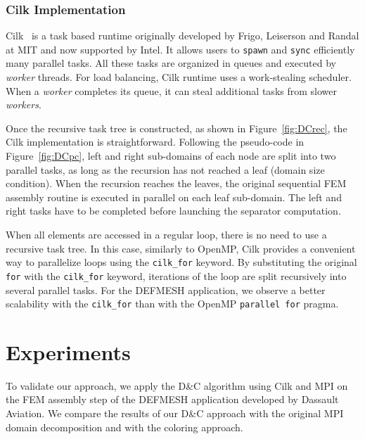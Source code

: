 \documentclass[10pt]{IOS-Book-Article}
\begin{document}
\subsubsection{Cilk Implementation}
Cilk~\cite{cilk5} is a task based runtime originally developed by Frigo, Leiserson and Randal at MIT and now supported by Intel.
It allows users to {\tt spawn} and {\tt sync} efficiently many parallel tasks.
All these tasks are organized in queues and executed by \emph{worker} threads.
For load balancing, Cilk runtime uses a work-stealing scheduler.
When a \emph{worker} completes its queue, it can steal additional tasks from slower \emph{workers}.

Once the recursive task tree is constructed, as shown in Figure~\ref{fig:DCrec}, the Cilk implementation is straightforward.
Following the pseudo-code in Figure~\ref{fig:DCpc}, left and right sub-domains of each node are split into two parallel tasks, as long as the recursion has not reached a leaf (domain size condition).
When the recursion reaches the leaves, the original sequential FEM assembly routine is executed in parallel on each leaf sub-domain.
The left and right tasks have to be completed before launching the separator computation. 


When all elements are accessed in a regular loop, there is no need to use a recursive task tree.
In this case, similarly to OpenMP, Cilk provides a convenient way to parallelize loops using the { \tt cilk\_for} keyword.
By substituting the original {\tt for} with the {\tt cilk\_for} keyword, iterations of the loop are split recursively into several parallel tasks.
For the DEFMESH application, we observe a better scalability with the {\tt cilk\_for} than with the OpenMP {\tt parallel for} pragma.


\section{Experiments}
\label{sec:exp}
To validate our approach, we apply the D\&C algorithm using Cilk and MPI on the FEM assembly step of the DEFMESH application developed by Dassault Aviation.
We compare the results of our D\&C approach with the original MPI domain decomposition and with the coloring approach.
\end{document}
